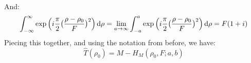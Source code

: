             And:
            \begin{equation*}
                \int_{-\infty}^{\infty}
                \exp\Big(i\frac{\pi}{2}
                    \big(\frac{\rho-\rho_0}{F}\big)^{2}\Big)
                \mathop{}\!\mathrm{d}{\rho}
                =\underset{a\rightarrow \infty}{\lim}
                \int_{-a}^{a}
                \exp\Big(i\frac{\pi}{2}
                    \big(\frac{\rho-\rho_0}{F}\big)^{2}\Big)
                \mathop{}\!\mathrm{d}{\rho}
                =F(1+i)
            \end{equation*}
            Piecing this together, and using the notation from before,
            we have:
            \begin{equation*}
            \hat{T}(\rho_0)=M-H_{M}(\rho_0,F;a,b)
            \end{equation*}
